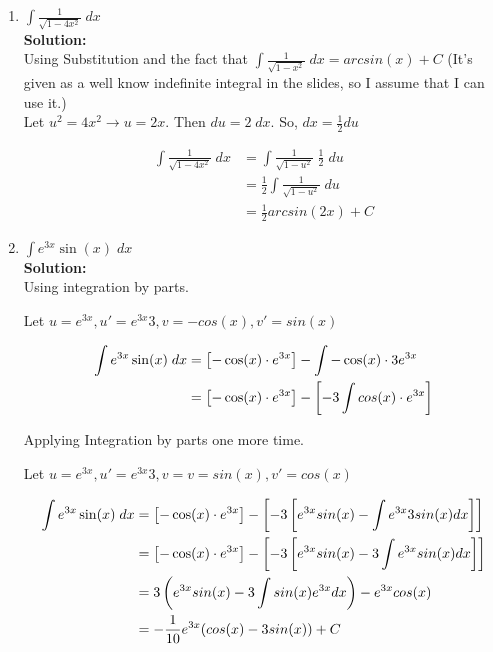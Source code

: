 \documentclass[a4paper]{article}
\begin{document}
\begin{enumerate}
\begin{enumerate}
	
	\item $\int \frac{1}{\sqrt{1 - 4x^2}} \; dx$\\
	\textbf{Solution:}\\
	
Using Substitution and the fact that $\int \frac{1}{\sqrt{1-x^2}} \; dx = arcsin(x) + C$ (It's given as a well know indefinite integral in the slides, so I assume that I can use it.)\\

Let $u^2 = 4x^2 \rightarrow u = 2x$. Then $du = 2\; dx$. So, $dx = \frac{1}{2}du$ 

\begin{align*}
	\int \frac{1}{\sqrt{1 - 4x^2}} \; dx &= \int \frac{1}{\sqrt{1 - u^2}} \; \frac{1}{2} \; du\\
	&= \frac{1}{2}  \int \frac{1}{\sqrt{1 - u^2}} \; du\\
	&= \frac{1}{2} arcsin(2x) + C 
\end{align*}	

	\item $\int e^{3x}\sin(x) \; dx$\\
	\textbf{Solution:}\\


Using integration by parts.

Let $u = e^{3x}, u' = e^{3x}3, v = -cos(x), v' = sin(x)$




\begin{align}
	\int e^{3x}\sin(x) \; dx &= \left[ -\cos(x) \cdot e^{3x} \right] - \int - \cos(x) \cdot 3e^{3x}\notag\\
	&= \left[ -\cos(x) \cdot e^{3x} \right] - \left[ -3 \int cos(x) \cdot e^{3x} \right]\notag
\end{align}	

Applying Integration by parts one more time.

Let $u = e^{3x}, u' = e^{3x}3, v = v = sin(x), v' = cos(x)$

\begin{align}
	\int e^{3x}\sin(x) \; dx &= \left[ -\cos(x) \cdot e^{3x} \right] - \left[ -3 \left[ e^{3x}sin(x) - \int e^{3x} 3sin(x) dx \right] \right]\notag\\
	&= \left[ -\cos(x) \cdot e^{3x} \right] - \left[ -3 \left[ e^{3x}sin(x) - 3 \int e^{3x} sin(x) dx \right] \right]\notag\\
	&= 3 \left( e^{3x}sin(x) - 3 \int sin(x)e^{3x}dx\right) - e^{3x}cos(x) \notag\\
	&= - \frac{1}{10}e^{3x}(cos(x) - 3sin(x)) + C\notag
\end{align}
		


\end{enumerate}
\end{enumerate}
\end{document}
